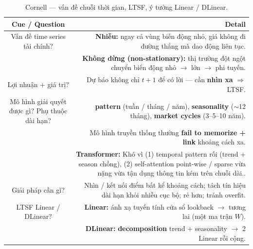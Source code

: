 \documentclass[12pt,a4paper]{article}
\newcommand{\cornellhead}{%
  \toprule
  \textbf{Cue / Question} & \textbf{Detail} \\
  \midrule
}
\begin{document}
\begin{table}[H]
  \centering
  \caption{Cornell --- vấn đề chuỗi thời gian, LTSF, ý tưởng Linear / DLinear.}
  \label{tab:cornell-motivation}
  \small
  \begin{tabularx}{\textwidth}{@{}CD@{}}
    \cornellhead
    Vấn đề time series tài chính? &
    \textbf{Nhiễu:} ngay cả vùng biến động nhỏ, giá không đi đường thẳng mà dao động liên tục.                                                                                                                \\
                                  & \textbf{Không dừng (non-stationary):} thị trường đột ngột chuyển biến động nhỏ $\to$ lớn $\to$ phi tuyến.                                                                 \\
    \addlinespace
    Lợi nhuận + giá trị?          &
    Dự báo không chỉ \(t{+}1\) để có lời --- cần \textbf{nhìn xa} $\Rightarrow$ LTSF.                                                                                                                         \\
    \addlinespace
    Mô hình giải quyết được gì?
    Phụ thuộc dài hạn?            &
    \textbf{pattern} (tuần / tháng / năm),
    \textbf{seasonality} ($\sim$12 tháng),
    \textbf{market cycles} (3--5--10 năm).                                                                                                                                                                    \\
                                  & Mô hình truyền thống thường \textbf{fail to memorize + link} khoảng cách xa.                                                                                              \\
                                  & \textbf{Transformer:} Khó vì (1) temporal pattern rối (trend + season chồng), (2) self-attention point-wise / sparse vừa nặng vừa tận dụng thông tin kém trên chuỗi dài.. \\
    \addlinespace
    Giải pháp cần gì?             &
    Nhìn / kết nối điểm bất kể khoảng cách;
    tách tín hiệu dài hạn khỏi nhiễu cục bộ;
    rẻ hơn; tránh overfit.                                                                                                                                                                                    \\
    \addlinespace
    LTSF Linear / DLinear?        &
    \textbf{Linear:} ánh xạ tuyến tính cửa sổ lookback $\to$ tương lai (một ma trận \(W\)).                                                                                                                   \\
                                  & \textbf{DLinear:} \textbf{decomposition} trend + seasonality $\to$ 2 Linear rồi cộng.                                                                                     \\
    \bottomrule
  \end{tabularx}
\end{table}
\end{document}
